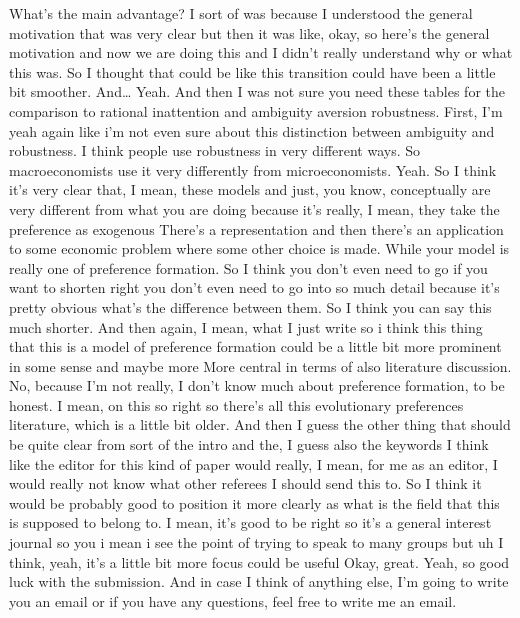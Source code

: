 What's the main advantage? I sort of was because I understood the general motivation that was very clear but then it was like, okay, so here's the general motivation and now we are doing this and I didn't really understand why or what this was. So I thought that could be like this transition could have been a little bit smoother. And… Yeah. And then I was not sure you need these tables for the comparison to rational inattention and ambiguity aversion robustness. First, I'm yeah again like i'm not even sure about this distinction between ambiguity and robustness. I think people use robustness in very different ways. So macroeconomists use it very differently from microeconomists. Yeah. So I think it's very clear that, I mean, these models and just, you know, conceptually are very different from what you are doing because it's really, I mean, they take the preference as exogenous There's a representation and then there's an application to some economic problem where some other choice is made. While your model is really one of preference formation. So I think you don't even need to go if you want to shorten right you don't even need to go into so much detail because it's pretty obvious what's the difference between them. So I think you can say this much shorter. And then again, I mean, what I just write so i think this thing that this is a model of preference formation could be a little bit more prominent in some sense and maybe more More central in terms of also literature discussion. No, because I'm not really, I don't know much about preference formation, to be honest. I mean, on this so right so there's all this evolutionary preferences literature, which is a little bit older. And then I guess the other thing that should be quite clear from sort of the intro and the, I guess also the keywords I think like the editor for this kind of paper would really, I mean, for me as an editor, I would really not know what other referees I should send this to. So I think it would be probably good to position it more clearly as what is the field that this is supposed to belong to. I mean, it's good to be right so it's a general interest journal so you i mean i see the point of trying to speak to many groups but uh I think, yeah, it's a little bit more focus could be useful Okay, great. Yeah, so good luck with the submission. And in case I think of anything else, I'm going to write you an email or if you have any questions, feel free to write me an email.












